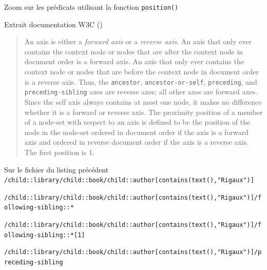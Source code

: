 \begin{frame}{Zoom sur les pr\'edicats utilisant la fonction \texttt{position()}}

{\LARGE\Pointinghand} Extrait documentation W3C (\cite{w3c/xpath})
\begin{footnotesize}
\begin{quote}
An axis is either a \textit{forward axis} or a \textit{reverse axis}. An axis that only ever contains the context node or nodes that are after the context node in document order is a forward axis. An axis that only ever contains the context node or nodes that are before the context node in document order is a reverse axis. Thus, the \texttt{ancestor}, \texttt{ancestor-or-self}, \texttt{preceding}, and \texttt{preceding-sibling} axes are reverse axes; all other axes are forward axes. Since the self axis always contains at most one node, it makes no difference whether it is a forward or reverse axis. The proximity position of a member of a node-set with respect to an axis is defined to be the position of the node in the node-set ordered in document order if the axis is a forward axis and ordered in reverse document order if the axis is a reverse axis. The first position is 1.
\end{quote}
\end{footnotesize}

\begin{tiny}
\begin{exampleblock}{Sur le fichier du listing pr\'ec\'edent}
\verb?/child::library/child::book/child::author[contains(text(),"Rigaux")] ?


\verb?/child::library/child::book/child::author[contains(text(),"Rigaux")]/following-sibling::* ?


\verb?/child::library/child::book/child::author[contains(text(),"Rigaux")]/following-sibling::*[1] ?


\verb?/child::library/child::book/child::author[contains(text(),"Rigaux")]/preceding-sibling ?


\end{exampleblock}
\end{tiny}
\end{frame}
